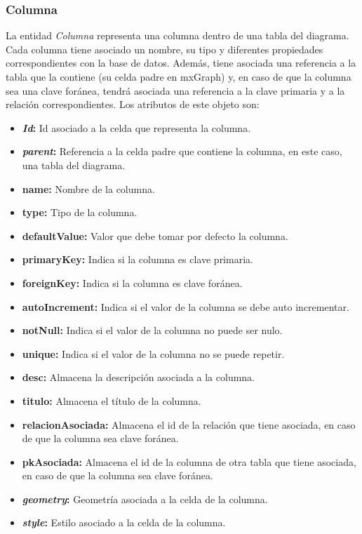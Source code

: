 \subsubsection{Columna}

La entidad \emph{Columna} representa una columna dentro de una tabla del diagrama. Cada columna tiene asociado un nombre, su tipo y diferentes propiedades correspondientes con la base de datos. Además, tiene asociada una referencia a la tabla que la contiene (su celda padre en mxGraph) y, en caso de que la columna sea una clave foránea, tendrá asociada una referencia a la clave primaria y a la relación correspondientes. Los atributos de este objeto son:
\begin{itemize}
    \item \textbf{\textit{Id}: }Id asociado a la celda que representa la columna.
    \item \textbf{\textit{parent}: }Referencia a la celda padre que contiene la columna, en este caso, una tabla del diagrama.
    \item \textbf{name: }Nombre de la columna.
    \item \textbf{type: }Tipo de la columna.
    \item \textbf{defaultValue: }Valor que debe tomar por defecto la columna.
    \item \textbf{primaryKey: }Indica si la columna es clave primaria.
    \item \textbf{foreignKey: }Indica si la columna es clave foránea.
    \item \textbf{autoIncrement: }Indica si el valor de la columna se debe auto incrementar.
    \item \textbf{notNull: }Indica si el valor de la columna no puede ser nulo.
    \item \textbf{unique: }Indica si el valor de la columna no se puede repetir.
    \item \textbf{desc: }Almacena la descripción asociada a la columna.
    \item \textbf{titulo: }Almacena el título de la columna.
    \item \textbf{relacionAsociada: }Almacena el id de la relación que tiene asociada, en caso de que la columna sea clave foránea.
    \item \textbf{pkAsociada: }Almacena el id de la columna de otra tabla que tiene asociada, en caso de que la columna sea clave foránea.
    \item \textbf{\textit{geometry}: }Geometría asociada a la celda de la columna.
    \item \textbf{\textit{style}: }Estilo asociado a la celda de la columna.
\end{itemize}

